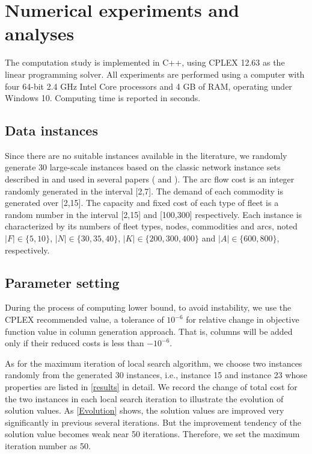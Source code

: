 \documentclass[11pt,nonblindrev,fleqn]{article}
\begin{document}
\section{Numerical experiments and analyses}\label{experiment}
The computation study is implemented in C++, using CPLEX 12.63 as the linear programming solver. All experiments are performed using a computer with four 64-bit 2.4 GHz Intel Core processors and 4 GB of RAM, operating under Windows 10. Computing time is reported in seconds.

\subsection{Data instances}
Since there are no suitable instances available in the literature, we randomly generate 30 large-scale instances based on the classic network instance sets described in \cite{crainic2001bundle} and used in several papers (\cite{Ghamlouche2003Cycle,Pedersen2009Models} and \cite{Chouman2015Cutting}). The arc flow cost is an integer randomly generated in the interval [2,7]. The demand of each commodity is generated over [2,15]. The capacity and fixed cost of each type of fleet is a random number in the interval [2,15] and [100,300] respectively. Each instance is characterized by its numbers of fleet types, nodes, commodities and arcs, noted $|F|\in \{5,10\}$, $|N|\in \{30,35,40\}$, $|K|\in \{200,300,400\}$ and $|A|\in \{600,800\}$, respectively.

\subsection{Parameter setting}
During the process of computing lower bound, to avoid instability, we use the CPLEX recommended value, a tolerance of $10^{-6}$ for relative change in objective function value in column generation approach. That is, columns will be added only if their reduced costs is less than $-10^{-6}$.

As for the maximum iteration of local search algorithm, we choose two instances randomly from the generated 30 instances, i.e., instance 15 and instance 23 whose properties are listed in \autoref{results} in detail. We record the change of total cost for the two instances in each local search iteration to illustrate the evolution of solution values. As \autoref{Evolution} shows, the solution values are improved very significantly in previous several iterations. But the improvement tendency of the solution value becomes weak near 50 iterations. Therefore, we set the maximum iteration number as 50.
\end{document}
